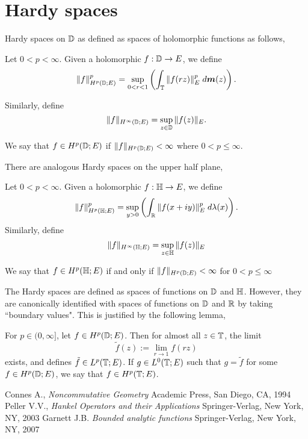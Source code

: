\documentclass{unswmaths}
\begin{document}
\section*{Hardy spaces}
Hardy spaces on $\mathbb{D}$ as defined as spaces of holomorphic functions as follows,
\begin{definition}
    Let $0 < p < \infty$. Given a holomorphic $f:\mathbb{D}\rightarrow E$, we define
    \begin{equation*}
        \|f\|_{H^p(\mathbb{D};E)}^p = \sup_{0 < r < 1} \left(\int_{\mathbb{T}} \|f(rz)\|_E^p \;d\boldsymbol{m}(z)\right).
    \end{equation*}

    
    Similarly, define
    \begin{equation*}
        \|f\|_{H^\infty(\mathbb{D};E)} = \sup_{z \in \mathbb{D}} \|f(z)\|_E.
    \end{equation*}
    
    We say that $f \in H^p(\mathbb{D};E)$ if $\|f\|_{H^p(\mathbb{D};E)} < \infty$ where $0 < p \leq \infty$.
\end{definition}

There are analogous Hardy spaces on the upper half plane,
\begin{definition}
    Let $0 < p < \infty$. Given a holomorphic $f:\mathbb{H}\rightarrow E$, we define
    \begin{equation*}
        \|f\|_{H^p(\mathbb{H};E)}^p = \sup_{y > 0} \left(\int_{\mathbb{R}} \|f(x+iy)\|_E^p\;d\lambda(x) \right).
    \end{equation*}
    Similarly, define
    \begin{equation*}
        \|f\|_{H^\infty(\mathbb{H};E)} = \sup_{z \in \mathbb{H}} \|f(z)\|_E
    \end{equation*}
   
    We say that $f \in H^p(\mathbb{H};E)$ if and only if $\|f\|_{H^p(\mathbb{D};E)} < \infty$ for $0 < p \leq \infty$
\end{definition}

The Hardy spaces are defined as spaces of functions on $\mathbb{D}$ and $\mathbb{H}$. However, they are canonically
identified with spaces of functions on $\mathbb{D}$ and $\mathbb{R}$ by taking ``boundary values". This is justified
by the following lemma,
\begin{lemma}
    For $p \in (0,\infty]$, let $f \in H^p(\mathbb{D};E)$. Then for almost all $z \in \mathbb{T}$, the limit
    \begin{equation*}
        \tilde{f}(z) := \lim_{r\rightarrow 1} f(rz)
    \end{equation*}
    exists, and defines $\tilde{f} \in L^p(\mathbb{T};E)$. If $g \in L^0(\mathbb{T};E)$
    such that $g = \tilde{f}$ for some $f \in H^p(\mathbb{D};E)$, we say that $f \in H^p(\mathbb{T};E)$. 
\end{lemma}

\begin{thebibliography}{9}
     Connes A., 
    \emph{Noncommutative Geometry}
     Academic Press, 
     San Diego, 
     CA, 
     1994
    Peller V.V.,
    \emph{Hankel Operators and their Applications}
    Springer-Verlag,
    New York, 
    NY,
    2003    
    Garnett J.B.
    \emph{Bounded analytic functions}
    Springer-Verlag,
    New York,
    NY,
    2007    
\end{thebibliography}
\end{document}

